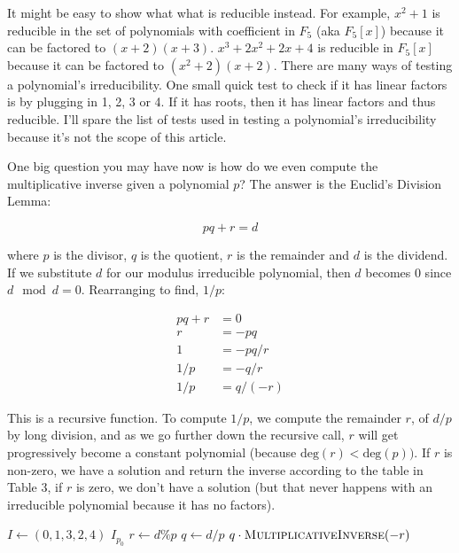 \documentclass{article}
\begin{document}
It might be easy to show what what is reducible instead. For example, $x^2
+ 1$ is reducible in the set of polynomials with coefficient in $F_5$
(aka $F_5[x]$) because it can be factored to $(x+2)(x+3)$.  $x^3 +
2x^2 + 2x + 4$ is reducible in $F_5[x]$ because it can be factored
to $(x^2+2)(x+2)$. There are many ways of testing a polynomial's
irreducibility. One small quick test to check if it has linear factors is
by plugging in 1, 2, 3 or 4. If it has roots, then it has linear factors
and thus reducible. I'll spare the list of tests used in testing a
polynomial's irreducibility because it's not the scope of this article.


One big question you may have now is how do we even compute the multiplicative inverse given a polynomial
$p$? The answer is the Euclid's Division Lemma:

\[ pq + r = d \]

where $p$ is the divisor, $q$ is the quotient, $r$ is the remainder and $d$ is the dividend. If we
substitute $d$ for our modulus irreducible polynomial, then $d$ becomes 0 since $d \mod d = 0$. Rearranging
to find, $1/p$:

\begin{align*}
  pq +r &= 0 \\
  r &= -pq \\
  1 &= -pq/r \\
  1/p &= -q/r \\
  1/p &= q/(-r)
\end{align*}

This is a recursive function. To compute $1/p$, we compute the remainder $r$,
of $d/p$ by long division, and as we go further down the recursive call, $r$ will
get progressively become a constant polynomial (because $\textrm{deg}(r) < \textrm{deg}(p))$. If $r$ is non-zero, we have a solution and return the inverse according to the table in Table 3, if $r$ is zero, we don't have a solution (but that never
happens with an irreducible polynomial because it has no factors).

\begin{algorithmic}[1]
  \State $I \gets (0, 1, 3, 2, 4)$
    \State \Return $I_{p_0}$ 
  \EndIf
  \State $r \gets d \% p$
  \State $q \gets d / p$
  \State \Return $q\cdot \Call{MultiplicativeInverse}{-r}$
  \EndFunction
\end{algorithmic}
\end{document}
